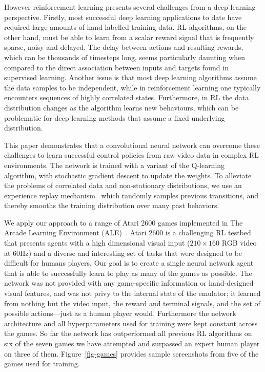 \documentclass{article} \usepackage{nips13submit_e,times}
\begin{document}
However reinforcement learning presents several challenges from a deep learning perspective.
Firstly, most successful deep learning applications to date have required large amounts of hand-labelled training data.
RL algorithms, on the other hand, must be able to learn from a scalar reward signal that is frequently sparse, noisy and delayed.
The delay between actions and resulting rewards, which can be thousands of timesteps long, seems particularly daunting when compared to the direct association between inputs and targets found in supervised learning.
Another issue is that most deep learning algorithms assume the data samples to be independent, while in reinforcement learning one typically encounters sequences of highly correlated states.
Furthermore, in RL the data distribution changes as the algorithm learns new behaviours, which can be problematic for deep learning methods that assume a fixed underlying distribution.




This paper demonstrates that a convolutional neural network can overcome these challenges to learn successful control policies from raw video data in complex RL environments.
The network is trained with a variant of the Q-learning~\cite{watkins-qlearning} algorithm, with stochastic gradient descent to update the weights.
To alleviate the problems of correlated data and non-stationary distributions, we use an experience replay mechanism~\cite{lin1993reinforcement} which randomly samples previous transitions, and thereby smooths the training distribution over many past behaviors.



We apply our approach to a range of Atari 2600 games implemented in The Arcade Learning Environment (ALE)~\cite{bellemare-ale}.
Atari 2600 is a challenging RL testbed that presents agents with a high dimensional visual input ($210 \times 160$ RGB video at 60Hz) and a diverse and interesting set of tasks that were designed to be difficult for humans players.
Our goal is to create a single neural network agent that is able to successfully learn to play as many of the games as possible.
The network was not provided with any game-specific information or hand-designed visual features, and was not privy to the internal state of the emulator; it learned from nothing but the video input, the reward and terminal signals, and the set of possible actions---just as a human player would.
Furthermore the network architecture and all hyperparameters used for training were kept constant across the games.
So far the network has outperformed all previous RL algorithms on six of the seven games we have attempted and surpassed an expert human player on three of them.
Figure~\ref{fig-games} provides sample screenshots from five of the games used for training.
\end{document}
